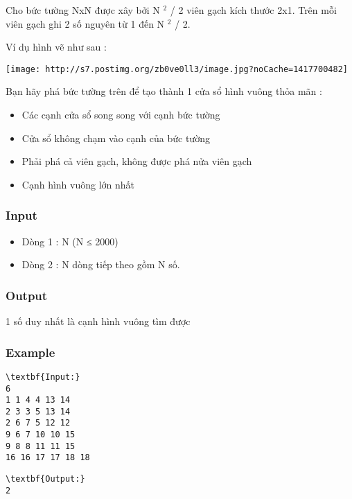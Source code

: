 

Cho bức tường NxN được xây bởi N $^ 2 $ / 2 viên gạch kích thước 2x1. Trên mỗi viên gạch ghi 2 số nguyên từ 1 đến N $^ 2 $ / 2.

Ví dụ hình vẽ như sau :


\texttt{[image: http://s7.postimg.org/zb0ve0ll3/image.jpg?noCache=1417700482]}

Bạn hãy phá bức tường trên để tạo thành 1 cửa sổ hình vuông thỏa mãn :
\begin{itemize}
	\item Các cạnh cửa sổ song song với cạnh bức tường
	\item Cửa sổ không chạm vào cạnh của bức tường
	\item Phải phá cả viên gạch, không được phá nửa viên gạch
	\item Cạnh hình vuông lớn nhất
\end{itemize}

\subsubsection{Input}
\begin{itemize}
	\item Dòng 1 : N (N ≤ 2000)
	\item Dòng 2 : N dòng tiếp theo gồm N số.
\end{itemize}

\subsubsection{Output}

1 số duy nhất là cạnh hình vuông tìm được

\subsubsection{Example}
\begin{verbatim}
\textbf{Input:}
6
1 1 4 4 13 14
2 3 3 5 13 14
2 6 7 5 12 12
9 6 7 10 10 15
9 8 8 11 11 15
16 16 17 17 18 18 \end{verbatim}
\begin{verbatim}
\textbf{Output:}
2\end{verbatim}
